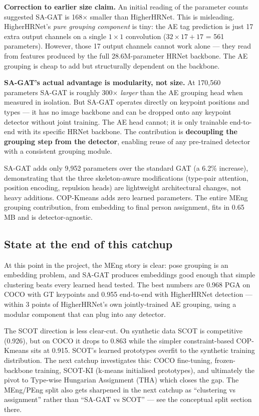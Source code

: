 \textbf{Correction to earlier size claim.} An initial reading of the parameter counts suggested SA-GAT is 168$\times$ smaller than HigherHRNet. This is misleading. HigherHRNet's \emph{pure grouping component} is tiny: the AE tag prediction is just 17 extra output channels on a single $1 \times 1$ convolution ($32 \times 17 + 17$ = 561 parameters). However, those 17 output channels cannot work alone --- they read from features produced by the full 28.6M-parameter HRNet backbone. The AE grouping is cheap to add but structurally dependent on the backbone.

\textbf{SA-GAT's actual advantage is modularity, not size.} At 170,560 parameters SA-GAT is roughly 300$\times$ \emph{larger} than the AE grouping head when measured in isolation. But SA-GAT operates directly on keypoint positions and types --- it has no image backbone and can be dropped onto any keypoint detector without joint training. The AE head cannot; it is only trainable end-to-end with its specific HRNet backbone. The contribution is \textbf{decoupling the grouping step from the detector}, enabling reuse of any pre-trained detector with a consistent grouping module.

SA-GAT adds only 9,952 parameters over the standard GAT (a 6.2\% increase), demonstrating that the three skeleton-aware modifications (type-pair attention, position encoding, repulsion heads) are lightweight architectural changes, not heavy additions. COP-Kmeans adds zero learned parameters. The entire MEng grouping contribution, from embedding to final person assignment, fits in 0.65\,MB and is detector-agnostic.


\subsection{State at the end of this catchup}

At this point in the project, the MEng story is clear: pose grouping is an embedding problem, and SA-GAT produces embeddings good enough that simple clustering beats every learned head tested. The best numbers are 0.968 PGA on COCO with GT keypoints and 0.955 end-to-end with HigherHRNet detection --- within 3 points of HigherHRNet's own jointly-trained AE grouping, using a modular component that can plug into any detector.

The SCOT direction is less clear-cut. On synthetic data SCOT is competitive (0.926), but on COCO it drops to 0.863 while the simpler constraint-based COP-Kmeans sits at 0.915. SCOT's learned prototypes overfit to the synthetic training distribution. The next catchup investigates this: COCO fine-tuning, frozen-backbone training, SCOT-KI (k-means initialised prototypes), and ultimately the pivot to Type-wise Hungarian Assignment (THA) which closes the gap. The MEng/PEng split also gets sharpened in the next catchup as ``clustering vs assignment'' rather than ``SA-GAT vs SCOT'' --- see the conceptual split section there.
